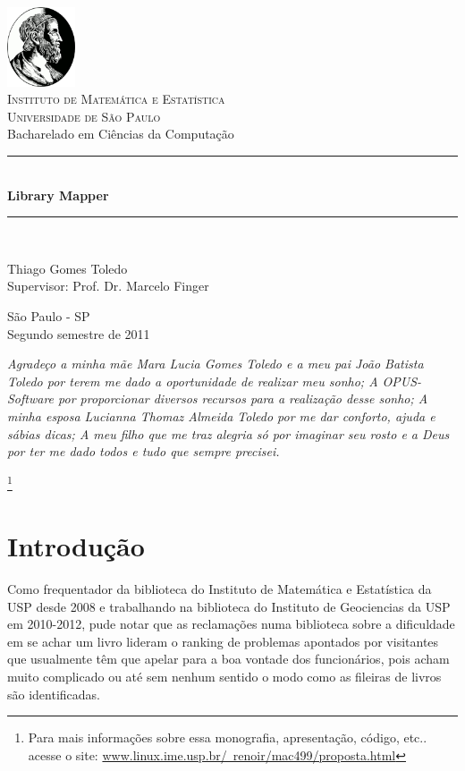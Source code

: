\documentclass[a4paper,10pt]{article}
\newcommand{\HRule}{\rule{\linewidth}{0.5mm}}
\begin{document}
\begin{titlepage}

\begin{center}
\includegraphics[width=0.15\textwidth]{./imgs/IME.png}\\[1cm]
\textsc{\Large Instituto de Matemática e Estatística\\ Universidade de São Paulo}\\[0.5cm]
{\large Bacharelado em Ciências da Computação}\\[5.0cm]
\HRule \\[0.4cm]
{\huge \bfseries Library Mapper} 
\HRule \\[1.0cm]

\begin{flushleft} \large
{\large Thiago Gomes Toledo\\ Supervisor: Prof. Dr. Marcelo Finger}
\end{flushleft}
\vfill

{\large São Paulo - SP\\[0.5cm] Segundo semestre de 2011}
\end{center}
\end{titlepage}

\newpage

\textit{ Agradeço a minha mãe Mara Lucia Gomes Toledo e a meu pai João Batista Toledo por terem me dado a oportunidade de realizar 
meu sonho; A OPUS-Software por proporcionar diversos recursos para a realização desse sonho; A minha esposa Lucianna Thomaz Almeida Toledo por me dar conforto, ajuda e sábias dicas; A meu filho que me traz
alegria só por imaginar seu rosto e a Deus por ter me dado todos e tudo que sempre precisei.}


\footnote[1]{Para mais informações sobre essa monografia, apresentação, código, etc.. acesse o site: \href{''http://www.linux.ime.usp.br/~renoir/mac499/proposta.html''}{www.linux.ime.usp.br/~renoir/mac499/proposta.html}}
\newpage
 \tableofcontents
\newpage
    \section{Introdução}
   
    Como frequentador da biblioteca do Instituto de Matemática e 
    Estatística da USP desde 2008 e trabalhando na biblioteca do Instituto de Geociencias da USP em 2010-2012, 
    pude notar que as reclamações numa biblioteca sobre a dificuldade em se achar um livro lideram o ranking de 
    problemas apontados por visitantes que usualmente têm que apelar para a boa vontade dos funcionários, 
    pois acham muito complicado ou até sem nenhum sentido o modo como as fileiras de livros são identificadas.\\
    
\end{document}
